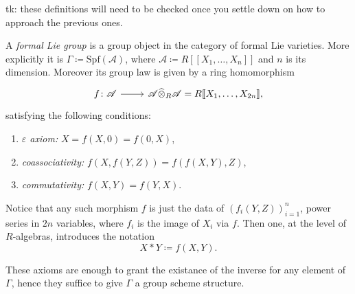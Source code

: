 \documentclass[../Main]{subfiles}
\begin{document}
tk: these definitions will need to be checked once you settle down on how 
to approach the previous ones.
\begin{defn}
	A {\em formal Lie group} is a group object in the category of
	formal Lie varieties.
	More explicitly it is $\Gamma \coloneqq \mathrm{Spf}\left( \mathscr{A} \right)$,
	where $\mathscr{A} \coloneqq R [\![ X_1, \ldots, X_{ n } ]\!]$
	and $n$ is its dimension. 
	Moreover its group law is given by a ring homomorphism
	\begin{equation*}
	\begin{tikzcd}[row sep = 0ex
		,/tikz/column 1/.append style={anchor=base east}
		,/tikz/column 2/.append style={anchor=base west}]
		f\colon \mathscr{A} \arrow[r, "", rightarrow] &
		\mathscr{A} \widehat{\otimes}_R \mathscr{A} =
		R [\![ X_1, \ldots, X_{ 2n } ]\!]
	,\end{tikzcd}
	\end{equation*} 
	satisfying the following conditions:
	\begin{enumerate}
		\item {\em $\varepsilon$ axiom:} $X = f(X,0) = f(0,X)$,
		\item {\em coassociativity:} $f(X, f(Y,Z)) = f(f(X,Y), Z)$,
		\item {\em commutativity:} $f(X,Y) = f(Y,X)$.
	\end{enumerate}
	Notice that any such morphism $f$ is just the data of 
	$\left( f_i(Y,Z) \right)_{i=1}^n$, power series in $2n$ variables, where
	$f_i$ is the image of $X_i$ via $f$.
	Then one, at the level of $R$-algebras, introduces the notation
	\begin{equation*}
		X \ast Y \coloneqq f(X,Y)
	.\end{equation*} 
\end{defn}

\begin{rem}[]
	These axioms are enough to grant the existance of the inverse for any element of $\Gamma$,
	hence they suffice to give $\Gamma$ a group scheme structure.
\end{rem}
\end{document}
